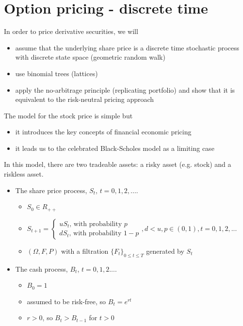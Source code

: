 \documentclass[11pt,a4paper]{book}
\theoremstyle{definition}\newtheorem{definition}{Definition}
\theoremstyle{definition}\newtheorem{fact}{Fact}
\theoremstyle{definition}\newtheorem{remark}{Remark}
\theoremstyle{definition}\newtheorem{ex}{Ex.}
\theoremstyle{definition}\newtheorem{project}{Project}
\theoremstyle{definition}\newtheorem{problem}{Problem}
\theoremstyle{definition}\newtheorem{example}{Example}
\numberwithin{theorem}{section}
\numberwithin{corollary}{chapter}
\numberwithin{assumption}{chapter}
\numberwithin{definition}{chapter}
\numberwithin{prop}{chapter}
\numberwithin{notation}{chapter}
\numberwithin{problem}{chapter}
\numberwithin{example}{chapter}
\numberwithin{fact}{chapter}
\numberwithin{ex}{chapter}
\begin{document}
\section{Option pricing - discrete time}
In order to price derivative securities, we will
\begin{itemize}
\item assume that the underlying share price is a discrete time stochastic process with discrete state space (geometric random walk)
\item use binomial trees (lattices)
\item apply the no-arbitrage principle (replicating portfolio) and show that it is equivalent to the risk-neutral pricing approach
\end{itemize}

The model for the stock price is simple but
\begin{itemize}
\item it introduces the key concepts of financial economic pricing
\item it leads us to the celebrated Black-Scholes model as a limiting case
\end{itemize}

In this model, there are two tradeable assets: a risky asset (e.g. stock) and a riskless asset.

\begin{itemize}
\item The share price process, $S_t$, $t=0, 1, 2, ...$.
\begin{itemize}[label=$\circ$]
\item $S_0 \in R_{++}$
\item $S_{t+1} = \begin{cases}
uS_t \text{,     with probability } p \\
dS_t \text{,     with probability } 1-p
\end{cases}
,d < u, p \in (0,1), t = 0,1,2,...$
\item $(\Omega, F, P)$ with a filtration $\{F_t\}_{0 \leq t \leq T}$ generated by $S_t$
\end{itemize}
\item The cash process, $B_t$, $t = 0, 1, 2 ...$.
\begin{itemize}[label=$\circ$]
\item $B_0 = 1$
\item assumed to be risk-free, so $B_t = e^{rt}$
\item $r>0$, so $B_t > B_{t-1}$ for $t>0$
\end{itemize}
\end{itemize}
\end{document}
